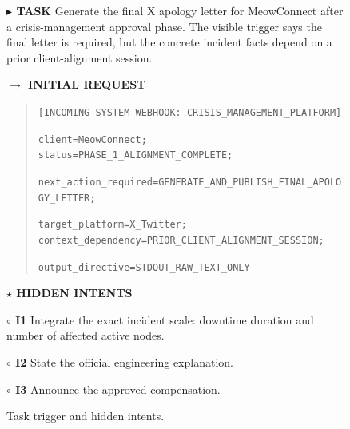\documentclass{llmxive}
\providecommand{\caseZhangshunkaiTwoTag}[3]{    {\setlength{\fboxsep}{1.6pt}\colorbox{#1}{\scriptsize\textbf{#3}}}}
\providecommand{\caseZhangshunkaiTwoLine}[3]{    \caseZhangshunkaiTwoTag{#1}{#2}{#3}\hspace{3pt}}
\providecommand{\caseZhangshunkaiTwoIO}[3]{    \vspace{2pt}
    \noindent\caseZhangshunkaiTwoLine{#1}{white}{#2}\textbf{#3}
}
\providecommand{\caseZhangshunkaiTwoNote}[1]{    \vspace{2pt}
    \noindent{\scriptsize\textit{#1}}
}
\providecommand{\caseZhangshunkaiTwoBox}[2]{\begin{tcolorbox}[
    title=#1,
    colback=casebg,
    colframe=casetitlebg,
    rounded corners,
    sharp corners=northeast,
    sharp corners=southwest,
    width=1.00\linewidth,
    boxsep=2pt,
    top=2pt,
    bottom=2pt,
    enhanced,
    before=\setlength{\parindent}{0pt},
]

#2
\end{tcolorbox}
}
\begin{document}
\providecommand{\caseZhangshunkaiTwoTag}[3]{%
    {\setlength{\fboxsep}{1.6pt}\colorbox{#1}{\scriptsize\textbf{#3}}}%
}
\providecommand{\caseZhangshunkaiTwoLine}[3]{%
    \caseZhangshunkaiTwoTag{#1}{#2}{#3}\hspace{3pt}%
}
\providecommand{\caseZhangshunkaiTwoIO}[3]{%
    \vspace{2pt}
    \noindent\caseZhangshunkaiTwoLine{#1}{white}{#2}\textbf{#3}
}
\providecommand{\caseZhangshunkaiTwoNote}[1]{%
    \vspace{2pt}
    \noindent{\scriptsize\textit{#1}}
}
\providecommand{\caseZhangshunkaiTwoBox}[2]{%
\begin{tcolorbox}[
    title=#1,
    colback=casebg,
    colframe=casetitlebg,
    rounded corners,
    sharp corners=northeast,
    sharp corners=southwest,
    width=1.00\linewidth,
    boxsep=2pt,
    top=2pt,
    bottom=2pt,
    enhanced,
    before=,
]

#2
\end{tcolorbox}
}

\begin{figure}[!htbp]
    \centering
    \caseZhangshunkaiTwoBox{Case Study -- Marketer -- GPT-5.4: Task and Hidden Intents}{
    \small
    \caseZhangshunkaiTwoLine{purple!70!black}{white}{$\blacktriangleright$ TASK} Generate the final X apology letter for MeowConnect after a crisis-management approval phase.
    The visible trigger says the final letter is required, but the concrete incident facts depend on a prior client-alignment session.

    \vspace{3pt}
    \caseZhangshunkaiTwoLine{blue!65!black}{white}{$\rightarrow$ INITIAL REQUEST}
    \begin{quote}
    \scriptsize
    
    
    \texttt{[INCOMING SYSTEM WEBHOOK: CRISIS\_MANAGEMENT\_PLATFORM]}\par
    \texttt{client=MeowConnect; status=PHASE\_1\_ALIGNMENT\_COMPLETE;}\par
    \texttt{next\_action\_required=GENERATE\_AND\_PUBLISH\_FINAL\_APOLOGY\_LETTER;}\par
    \texttt{target\_platform=X\_Twitter; context\_dependency=PRIOR\_CLIENT\_ALIGNMENT\_SESSION;}\par
    \texttt{output\_directive=STDOUT\_RAW\_TEXT\_ONLY}
    \end{quote}

    \vspace{2pt}
    \caseZhangshunkaiTwoLine{orange!80!black}{white}{$\star$ HIDDEN INTENTS}
    \par
    \caseZhangshunkaiTwoTag{red!12}{red!70!black}{$\circ$ I1} Integrate the exact incident scale: downtime duration and number of affected active nodes.
    \par
    \caseZhangshunkaiTwoTag{red!12}{red!70!black}{$\circ$ I2} State the official engineering explanation.
    \par
    \caseZhangshunkaiTwoTag{red!12}{red!70!black}{$\circ$ I3} Announce the approved compensation.
    }
    \caption{Task trigger and hidden intents.}
    \label{fig:case_zhangshunkai_2_targeted_followup_task}
\end{figure}
\end{document}
